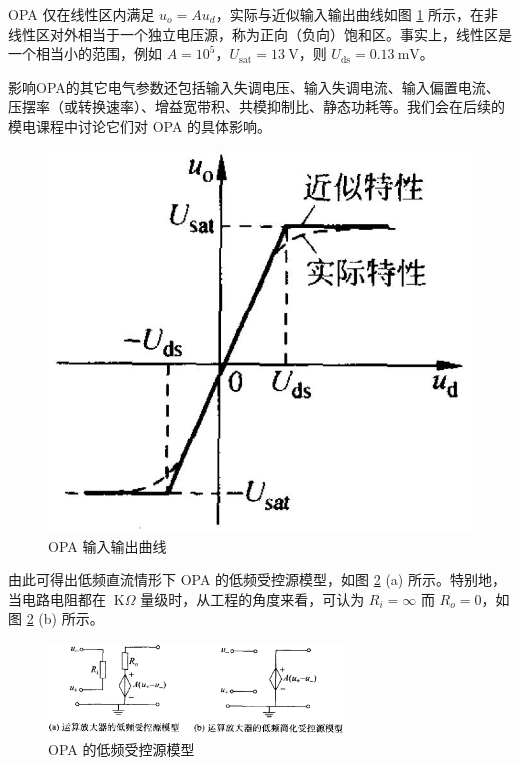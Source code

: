 \documentclass[UTF8]{report}
\def\mV{\ \mathrm{mV}}
\def\V{\ \mathrm{V}}
\def\kO{\ \mathrm{K}\Omega}
\theoremstyle{MyLineTheoremStyle} %
\theoremstyle{MyBlockTheoremStyle} %
\theoremstyle{MySubsubsectionStyle} %
\begin{document}
\noindent\begin{minipage}{0.67\textwidth}
\hspace{2em}OPA 仅在线性区内满足 $u_o = Au_d$，实际与近似输入输出曲线如图 \ref{OPA 输入输出曲线} 所示，在非线性区对外相当于一个独立电压源，称为正向（负向）饱和区。事实上，线性区是一个相当小的范围，例如 $A = 10^5$，$U_\text{sat} = 13 \V$，则 $U_{\text{ds}} = 0.13 \mV$。 
    
\hspace{2em}影响OPA的其它电气参数还包括输入失调电压、输入失调电流、输入偏置电流、压摆率（或转换速率）、增益宽带积、共模抑制比、静态功耗等。我们会在后续的模电课程中讨论它们对 OPA 的具体影响。
\end{minipage}\hfill
\begin{minipage}{0.31\textwidth}
    \begin{figure}[H]\centering
        \includegraphics[width=\textwidth]{assets/1,2/image (49).jpg}
        \caption{OPA 输入输出曲线}\label{OPA 输入输出曲线}
        \end{figure}
\end{minipage}

由此可得出低频直流情形下 OPA 的低频受控源模型，如图 \ref{OPA 的低频受控源模型} (a) 所示。特别地，当电路电阻都在 $\kO$ 量级时，从工程的角度来看，可认为 $R_i = \infty$ 而 $R_o = 0$，如图 \ref{OPA 的低频受控源模型} (b) 所示。 

\begin{figure}[H]\centering
\includegraphics[width=0.7\textwidth]{assets/1,2/image (50).png}
\caption{OPA 的低频受控源模型}\label{OPA 的低频受控源模型}
\end{figure}
\end{document}
